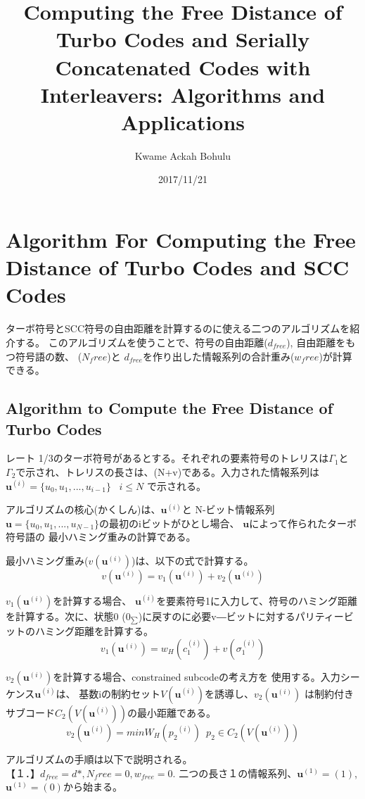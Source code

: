 \documentclass[20 pts]{article}
\title{Computing the Free Distance of Turbo Codes and Serially Concatenated Codes
 with Interleavers: Algorithms and Applications}
\author{Kwame Ackah Bohulu}
\date{2017/11/21}
\begin{document}
\maketitle

\newpage



\section{Algorithm For Computing the Free Distance of Turbo Codes and SCC Codes}
ターボ符号とSCC符号の自由距離を計算するのに使える二つのアルゴリズムを紹介する。
このアルゴリズムを使うことで、符号の自由距離($d_{free}$), 自由距離をもつ符号語の数、
($N_free$)と $d_{free}$を作り出した情報系列の合計重み($w_free$)が計算できる。

\subsection{Algorithm to Compute the Free Distance of Turbo Codes}
レート 1/3のターボ符号があるとする。それぞれの要素符号のトレリスは$\Gamma_1$と
$\Gamma_2$で示され、トレリスの長さは、(N+v)である。入力された情報系列は
$\mathbf{u}^{(i)}=\{u_0,u_1,...,u_{i-1}\}\,\,\,\,\, i\leq N$ で示される。

アルゴリズムの核心(かくしん)は、$\mathbf{u}^{(i)}$と
N-ビット情報系列$\mathbf{u}=\{u_0,u_1,...,u_{N-1}\}$の最初のiビットがひとし場合、
$\mathbf{u}$によって作られたターボ符号語の
最小ハミング重みの計算である。

最小ハミング重み($\mathit{v(\mathbf{u}^{(i)})}$)は、以下の式で計算する。
$$\mathit{v(\mathbf{u}^{(i)})}=\mathit{v_1(\mathbf{u}^{(i)})}+
\mathit{v_2(\mathbf{u}^{(i)})}$$

$\mathit{v_1(\mathbf{u}^{(i)})}$を計算する場合、
$\mathbf{u}^{(i)}$を要素符号1に入力して、符号のハミング距離を計算する。次に、状態0
($0_{\sum}$)に戻すのに必要v―ビットに対するパリティービットのハミング距離を計算する。
$$\mathit{v_1(\mathbf{u}^{(i)})}=\mathit{w}_H(c_1^{(i)})+v(\sigma_1^{(i)})$$

$\mathit{v_2(\mathbf{u}^{(i)})}$を計算する場合、constrained subcodeの考え方を
使用する。入力シーケンス$\mathbf{u}^{(i)}$は、
基数iの制約セット$V(\mathbf{u}^{(i)})$を誘導し、$\mathit{v_2(\mathbf{u}^{(i)})}$
は制約付きサブコード$\mathit{C}_2(V(\mathbf{u}^{(i)}))$の最小距離である。
$$\mathit{v}_2(\mathbf{u}^{(i)}) = min\mathit{W}_H({p_2}^{(i)})\,\,\, p_2 \in
\mathit{C}_2(V(\mathbf{u}^{(i)}))$$

アルゴリズムの手順は以下で説明される。\\
【１．】$d_{free}=d*, N_free =0,w_{free}=0$.
二つの長さ１の情報系列、$\mathbf{u}^{(1)}=(1)$,$\mathbf{u}^{(1)}=(0)$から始まる。
\end{document}
